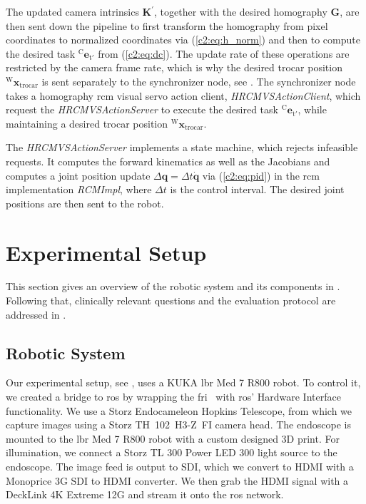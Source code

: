 The updated camera intrinsics $\mathbf{K}^\prime$, together with the desired homography $\mathbf{G}$, are then sent down the pipeline to first transform the homography from pixel coordinates to normalized coordinates via (\eqref{c2:eq:h_norm}) and then to compute the desired task $^\text{C}\mathbf{e}_{\text{t}'}$ from (\eqref{c2:eq:dc}). The update rate of these operations are restricted by the camera frame rate, which is why the desired trocar position $^\text{W}\mathbf{x}_\text{trocar}$ is sent separately to the synchronizer node, see . The synchronizer node takes a homography \acrshort{rcm} visual servo action client, \textit{HRCMVSActionClient}, which request the \textit{HRCMVSActionServer} to execute the desired task $^\text{C}\mathbf{e}_{\text{t}'}$, while maintaining a desired trocar position $^\text{W}\mathbf{x}_\text{trocar}$. 

The \textit{HRCMVSActionServer} implements a state machine, which rejects infeasible requests. It computes the forward kinematics as well as the Jacobians and computes a joint position update $\Delta\mathbf{q}=\Delta t\dot{\mathbf{q}}$ via (\eqref{c2:eq:pid}) in the \acrshort{rcm} implementation \textit{RCMImpl}, where $\Delta t$ is the control interval. The desired joint positions are then sent to the robot.

\section{Experimental Setup}
\label{c2:sec:experimental_setup}

This section gives an overview of the robotic system and its components in . Following that, clinically relevant questions and the evaluation protocol are addressed in .

\subsection{Robotic System}
\label{c2:sec:robotic_system}

Our experimental setup, see , uses a KUKA \acrshort{lbr} Med 7 R800 robot. To control it, we created a bridge to \acrfull{ros} by wrapping the \acrfull{fri}~\cite{schreiber2010fast} with \acrshort{ros}' Hardware Interface functionality. We use a Storz Endocameleon Hopkins Telescope, from which we capture images using a Storz TH~102~H3-Z~FI camera head. The endoscope is mounted to the \acrshort{lbr} Med 7 R800 robot with a custom designed 3D print. For illumination, we connect a Storz TL 300 Power LED 300 light source to the endoscope. The image feed is output to SDI, which we convert to HDMI with a Monoprice 3G SDI to HDMI converter. We then grab the HDMI signal with a DeckLink 4K Extreme 12G and stream it onto the \acrshort{ros} network.


